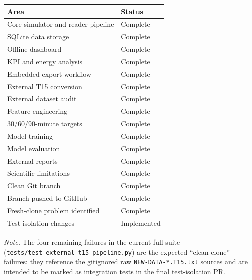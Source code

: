 \documentclass[11pt,a4paper]{article}
\begin{document}
\begin{center}
\renewcommand{\arraystretch}{1.25}
\begin{tabularx}{0.92\textwidth}{L{9.5cm}L{4cm}}
\toprule
\textbf{Area} & \textbf{Status} \\
\midrule
Core simulator and reader pipeline          & Complete \\
SQLite data storage                        & Complete \\
Offline dashboard                          & Complete \\
KPI and energy analysis                    & Complete \\
Embedded export workflow                   & Complete \\
External T15 conversion                    & Complete \\
External dataset audit                     & Complete \\
Feature engineering                        & Complete \\
30/60/90-minute targets                    & Complete \\
Model training                             & Complete \\
Model evaluation                           & Complete \\
External reports                           & Complete \\
Scientific limitations                     & Complete \\
Clean Git branch                           & Complete \\
Branch pushed to GitHub                    & Complete \\
Fresh-clone problem identified             & Complete \\
Test-isolation changes                     & Implemented \\
\bottomrule
\end{tabularx}
\end{center}

\vspace{1em}
\noindent\textit{Note.} The four remaining failures in the current full
suite (\texttt{tests/test\_external\_t15\_pipeline.py}) are the expected
``clean-clone'' failures: they reference the gitignored raw
\texttt{NEW-DATA-*.T15.txt} sources and are intended to be marked as
integration tests in the final test-isolation PR.
\end{document}
